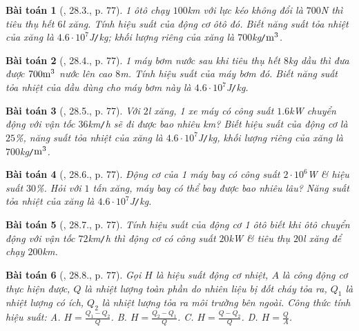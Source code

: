 \documentclass{article}
\newtheorem{baitoan}{Bài toán}
\begin{document}
\begin{baitoan}[\cite{SBT_Vat_Ly_8}, 28.3., p. 77]
	1 ôtô chạy $100$\emph{km} với lực kéo không đổi là $700$\emph{N} thì tiêu thụ hết $6$\emph{l} xăng. Tính hiệu suất của động cơ ôtô đó. Biết năng suất tỏa nhiệt của xăng là $4.6\cdot10^7$\emph{J\texttt{/}kg}; khối lượng riêng của xăng là $700$\emph{kg\texttt{/}$\rm m^3$}.
\end{baitoan}

\begin{baitoan}[\cite{SBT_Vat_Ly_8}, 28.4., p. 77]
	1 máy bơm nước sau khi tiêu thụ hết $8$\emph{kg} dầu thì đưa được $700\rm m^3$ nước lên cao $8$\emph{m}. Tính hiệu suất của máy bơm đó. Biết năng suất tỏa nhiệt của dầu dùng cho máy bơm này là  $4.6\cdot10^7$\emph{J\texttt{/}kg}.
\end{baitoan}

\begin{baitoan}[\cite{SBT_Vat_Ly_8}, 28.5., p. 77]
	Với $2$\emph{l} xăng, 1 xe máy có công suất $1.6$\emph{kW} chuyển động với vận tốc $36$\emph{km\texttt{/}h} sẽ đi được bao nhiêu \emph{km}? Biết hiệu suất của động cơ là $25$\%, năng suất tỏa nhiệt của xăng là $4.6\cdot10^7$\emph{J\texttt{/}kg}, khối lượng riêng của xăng là $700$\emph{kg\texttt{/}$\rm m^3$}.
\end{baitoan}

\begin{baitoan}[\cite{SBT_Vat_Ly_8}, 28.6., p. 77]
	Động cơ của 1 máy bay có công suất $2\cdot10^6$\emph{W} \& hiệu suất $30$\%. Hỏi với $1$ tấn xăng, máy bay có thể bay được bao nhiêu lâu? Năng suất tỏa nhiệt của xăng là $4.6\cdot10^7$\emph{J\texttt{/}kg}.
\end{baitoan}

\begin{baitoan}[\cite{SBT_Vat_Ly_8}, 28.7., p. 77]
	Tính hiệu suất của động cơ 1 ôtô biết khi ôtô chuyển động với vận tốc $72$\emph{km\texttt{/}h} thì động cơ có công suất $20$\emph{kW} \& tiêu thụ $20$\emph{l} xăng để chạy $200$\emph{km}.
\end{baitoan}

\begin{baitoan}[\cite{SBT_Vat_Ly_8}, 28.8., p. 77]
	Gọi $H$ là hiệu suất động cơ nhiệt, $A$ là công động cơ thực hiện được, $Q$ là nhiệt lượng toàn phần do nhiên liệu bị đốt cháy tỏa ra, $Q_1$ là nhiệt lượng có ích, $Q_2$ là nhiệt lượng tỏa ra môi trường bên ngoài. Công thức tính hiệu suất: {\sf A.} $H = \frac{Q_1 - Q_2}{Q}$. {\sf B.} $H = \frac{Q_2 - Q_1}{Q}$. {\sf C.} $H = \frac{Q - Q_2}{Q}$. {\sf D.} $H = \frac{Q}{A}$. 
\end{baitoan}
\end{document}
